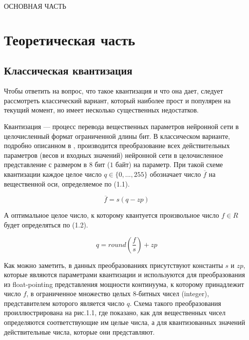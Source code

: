\Main
\hspace{0pt}
\vfill

\begin{center}
ОСНОВНАЯ ЧАСТЬ
\end{center}

\vfill
\hspace{0pt}
\pagebreak

\chapter{Теоретическая часть}
\label{cha:ch_1}

\section{Классическая квантизация}

Чтобы ответить на вопрос, что такое квантизация и что она дает, следует рассмотреть классический вариант, который наиболее прост и популярен на текущий момент, но имеет несколько существенных недостатков.

Квантизация — процесс перевода  вещественных параметров нейронной сети в целочисленный формат ограниченной длины бит. В классическом варианте, подробно описанном в \cite{quantization}, производится преобразование всех действительных параметров (весов и входных значений) нейронной сети в целочисленное представление с размером в $8$ бит ($1$ байт) на параметр. При такой схеме квантизации каждое целое число $q \in \{ 0, ..., 255 \}$ обозначает число $\overline{f}$ на вещественной оси, определяемое по (1.1).

\begin{equation}
\overline{f} = s(q - zp)
\end{equation}


А оптимальное целое число, к которому квантуется произвольное число $f \in R$ будет определяться по (1.2).

\begin{equation}
q = round \left( \frac{f}{s} \right) + zp
\end{equation}

Как можно заметить, в данных преобразованиях присутствуют константы $s$ и $zp$, которые являются параметрами квантизации и используются для преобразования из float-pointing представления мощности континуума, к которому принадлежит число $f$,  в ограниченное множество целых $8$-битных чисел (integer), представителем которого является число $q$. Схема такого преобразования проиллюстрирована на рис.1.1, где показано, как для вещественных чисел определяются соответствующие им целые числа, а для квантизованных значений действительные числа, которые они представляют.

